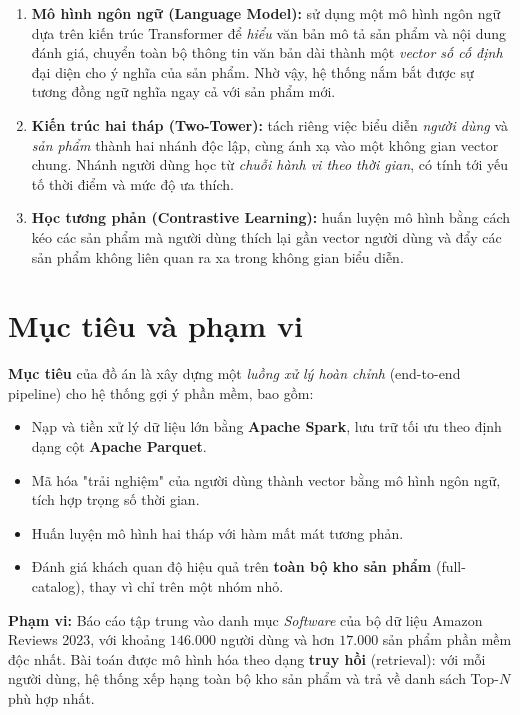 \begin{enumerate}[leftmargin=2em, itemsep=2pt]
    \item \textbf{Mô hình ngôn ngữ (Language Model):} sử dụng một mô hình ngôn ngữ
    dựa trên kiến trúc Transformer để \textit{hiểu} văn bản mô tả sản phẩm và nội
    dung đánh giá, chuyển toàn bộ thông tin văn bản dài thành một \textit{vector số
    cố định} đại diện cho ý nghĩa của sản phẩm. Nhờ vậy, hệ thống nắm bắt được sự
    tương đồng ngữ nghĩa ngay cả với sản phẩm mới.
    \item \textbf{Kiến trúc hai tháp (Two-Tower):} tách riêng việc biểu diễn
    \textit{người dùng} và \textit{sản phẩm} thành hai nhánh độc lập, cùng ánh xạ
    vào một không gian vector chung. Nhánh người dùng học từ \textit{chuỗi hành vi
    theo thời gian}, có tính tới yếu tố thời điểm và mức độ ưa thích.
    \item \textbf{Học tương phản (Contrastive Learning):} huấn luyện mô hình bằng
    cách kéo các sản phẩm mà người dùng thích lại gần vector người dùng và đẩy các
    sản phẩm không liên quan ra xa trong không gian biểu diễn.
\end{enumerate}

\section{Mục tiêu và phạm vi}

\textbf{Mục tiêu} của đồ án là xây dựng một \textit{luồng xử lý hoàn chỉnh}
(end-to-end pipeline) cho hệ thống gợi ý phần mềm, bao gồm:

\begin{itemize}[leftmargin=2em, itemsep=2pt]
    \item Nạp và tiền xử lý dữ liệu lớn bằng \textbf{Apache Spark}, lưu trữ tối ưu
    theo định dạng cột \textbf{Apache Parquet}.
    \item Mã hóa "trải nghiệm" của người dùng thành vector bằng mô hình ngôn ngữ,
    tích hợp trọng số thời gian.
    \item Huấn luyện mô hình hai tháp với hàm mất mát tương phản.
    \item Đánh giá khách quan độ hiệu quả trên \textbf{toàn bộ kho sản phẩm}
    (full-catalog), thay vì chỉ trên một nhóm nhỏ.
\end{itemize}

\textbf{Phạm vi:} Báo cáo tập trung vào danh mục \textit{Software} của bộ dữ liệu
Amazon Reviews 2023, với khoảng $146.000$ người dùng và hơn $17.000$ sản phẩm phần
mềm độc nhất. Bài toán được mô hình hóa theo dạng \textbf{truy hồi} (retrieval):
với mỗi người dùng, hệ thống xếp hạng toàn bộ kho sản phẩm và trả về danh sách
Top-$N$ phù hợp nhất.

